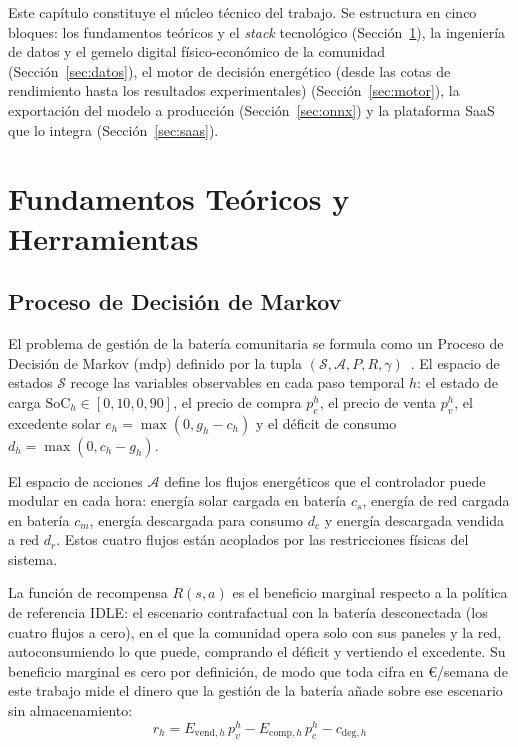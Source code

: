 \documentclass[12pt, a4paper, twoside]{report}
\begin{document}
Este capítulo constituye el núcleo técnico del trabajo. Se estructura en cinco
bloques: los fundamentos teóricos y el \textit{stack} tecnológico
(Sección~\ref{sec:fundamentos}), la ingeniería de datos y el gemelo digital
físico-económico de la comunidad (Sección~\ref{sec:datos}), el motor de
decisión energético (desde las cotas de rendimiento hasta los resultados
experimentales) (Sección~\ref{sec:motor}), la exportación del modelo a
producción (Sección~\ref{sec:onnx}) y la plataforma SaaS que lo integra
(Sección~\ref{sec:saas}).

\section{Fundamentos Teóricos y Herramientas}
\label{sec:fundamentos}

\subsection{Proceso de Decisión de Markov}

El problema de gestión de la batería comunitaria se formula como un
Proceso de Decisión de Markov (\acrshort{mdp}) definido por la tupla
$(\mathcal{S}, \mathcal{A}, P, R, \gamma)$~\citep{Sutton2018}.
El espacio de estados $\mathcal{S}$ recoge las variables observables en cada
paso temporal $h$: el estado de carga $\text{SoC}_h \in [0{,}10, 0{,}90]$, el
precio de compra $p_c^h$, el precio de venta $p_v^h$, el excedente solar
$e_h = \max(0, g_h - c_h)$ y el déficit de consumo $d_h = \max(0, c_h - g_h)$.

El espacio de acciones $\mathcal{A}$ define los flujos energéticos que el
controlador puede modular en cada hora: energía solar cargada en batería $c_s$,
energía de red cargada en batería $c_m$, energía descargada para consumo $d_c$
y energía descargada vendida a red $d_r$. Estos cuatro flujos están acoplados
por las restricciones físicas del sistema.

La función de recompensa $R(s,a)$ es el beneficio marginal respecto a la
política de referencia IDLE: el escenario contrafactual con la batería
desconectada (los cuatro flujos a cero), en el que la comunidad opera solo con
sus paneles y la red, autoconsumiendo lo que puede, comprando el déficit y
vertiendo el excedente. Su beneficio marginal es cero por definición, de modo
que toda cifra en €/semana de este trabajo mide el dinero que la gestión de la
batería añade sobre ese escenario sin almacenamiento:
\begin{equation}
  r_h = E_{\text{vend},h}\,p_v^h - E_{\text{comp},h}\,p_c^h - c_{\text{deg},h}
  \label{eq:recompensa}
\end{equation}
\end{document}

